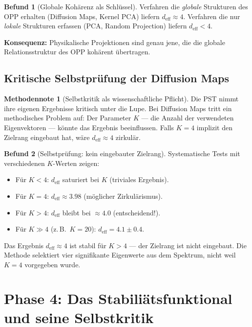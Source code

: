 \documentclass[11pt,a4paper]{article}
\theoremstyle{plain}
\theoremstyle{definition}
\newtheorem{methodennote}{Methodennote}[section]
\newtheorem{befund}{Befund}[section]
\newcommand{\deff}{d_{\mathrm{eff}}}
\begin{document}
\begin{befund}[Globale Koh\"{a}renz als Schl\"{u}ssel]
Verfahren die \emph{globale} Strukturen des OPP erhalten (Diffusion Maps,
Kernel PCA) liefern $\deff \approx 4$. Verfahren die nur \emph{lokale}
Strukturen erfassen (PCA, Random Projection) liefern $\deff < 4$.

\textbf{Konsequenz:} Physikalische Projektionen sind genau jene, die die
globale Relationsstruktur des OPP koh\"{a}rent \"{u}bertragen.
\end{befund}

\subsection{Kritische Selbstpr\"{u}fung der Diffusion Maps}

\begin{methodennote}[Selbstkritik als wissenschaftliche Pflicht]
Die PST nimmt ihre eigenen Ergebnisse kritisch unter die Lupe. Bei Diffusion
Maps tritt ein methodisches Problem auf: Der Parameter $K$ --- die Anzahl
der verwendeten Eigenvektoren --- k\"{o}nnte das Ergebnis beeinflussen.
Falls $K = 4$ implizit den Zielrang eingebaut hat, w\"{a}re $\deff \approx 4$
zirkul\"{a}r.
\end{methodennote}

\begin{befund}[Selbstpr\"{u}fung: kein eingebauter Zielrang]
Systematische Tests mit verschiedenen $K$-Werten zeigen:
\begin{itemize}
  \item F\"{u}r $K < 4$: $\deff$ saturiert bei $K$ (triviales Ergebnis).
  \item F\"{u}r $K = 4$: $\deff \approx 3.98$ (m\"{o}glicher Zirkul\"{a}rismus).
  \item F\"{u}r $K > 4$: $\deff$ bleibt bei $\approx 4.0$ (entscheidend!).
  \item F\"{u}r $K \gg 4$ (z.\,B.\ $K = 20$): $\deff = 4.1 \pm 0.4$.
\end{itemize}
Das Ergebnis $\deff \approx 4$ ist stabil f\"{u}r $K > 4$ --- der Zielrang
ist nicht eingebaut. Die Methode selektiert vier signifikante Eigenwerte
aus dem Spektrum, nicht weil $K = 4$ vorgegeben wurde.
\end{befund}

\section{Phase 4: Das Stabili\"{a}tsfunktional und seine Selbstkritik}
\end{document}
